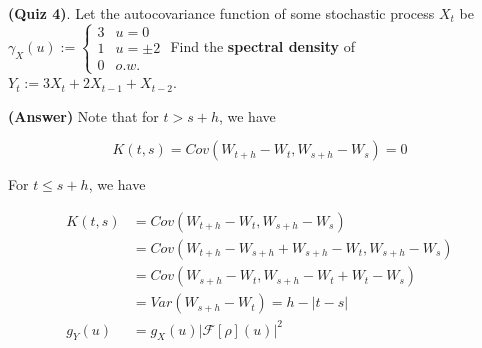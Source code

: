 \documentclass[12pt]{article}
\theoremstyle{nonumberbreak}
\begin{document}
\textbf{(Quiz 4)}. Let the autocovariance function of some stochastic process $X_t$ be $\gamma_X(u) := \begin{cases} 3 & u=0 \\ 1 & u=\pm2 \\ 0 & o.w. \end{cases}$ Find the \textbf{spectral density} of $Y_t := 3X_t + 2X_{t-1} + X_{t-2}$. 

\textbf{(Answer)} Note that for $t > s + h$, we have

$$
K(t,s) = Cov(W_{t+h} - W_t, W_{s+h} - W_s) = 0
$$

For $t \le s + h$, we have

$$
\begin{aligned}
K(t,s) &= Cov(W_{t+h} - W_t, W_{s+h} - W_s) \\[8pt]
&= Cov(W_{t+h} - W_{s+h} + W_{s+h} - W_t, W_{s+h} - W_s) \\[8pt]
&= Cov(W_{s+h} - W_t, W_{s+h} - W_t + W_t - W_s) \\[8pt]
&= Var(W_{s+h} - W_t) = h - |t - s| \\[8pt]
g_Y(u) &= g_X(u) |\mathcal{F}[\rho] (u)|^2
\end{aligned}
$$
\end{document}
